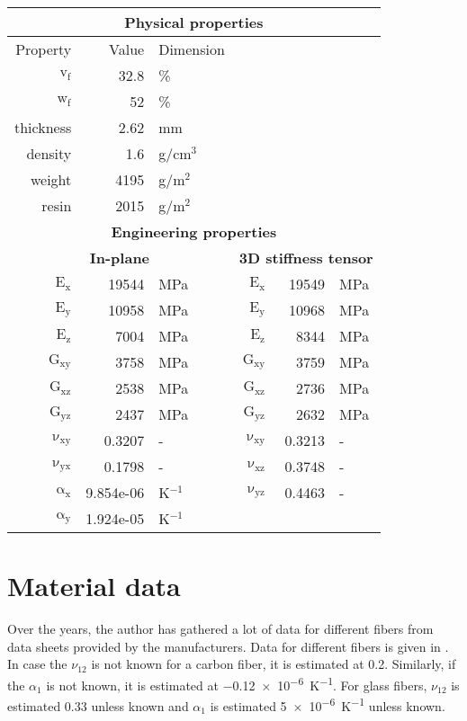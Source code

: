 \documentclass[a4paper,landscape,oneside,11pt,twocolumn]{memoir}
\begin{document}
\begin{table}[!htbp]
    \begin{tabular}[t]{rrlrrl}
      \multicolumn{6}{c}{\small\textbf{Physical properties}}\\[0.1em]
      \toprule
      Property & Value & Dimension\\
      \midrule
      $\mathrm{v_f}$ & 32.8 &\%\\
      $\mathrm{w_f}$ & 52 &\%\\
      thickness & 2.62 & mm\\
      density & 1.6 & g/cm$^3$\\
      weight & 4195 & g/m$^2$\\
      resin & 2015 & g/m$^2$\\
      \midrule
      \multicolumn{6}{c}{\small\textbf{Engineering properties}}\\[0.1em]
      \multicolumn{3}{c}{\small\textbf{In-plane}} &
      \multicolumn{3}{c}{\small\textbf{3D stiffness tensor}}\\[0.1em]
      $\mathrm{E_x}$ &    19544 & MPa & $\mathrm{E_x}$ &    19549 & MPa\\
      $\mathrm{E_y}$ &    10958 & MPa & $\mathrm{E_y}$ &    10968 & MPa\\
      $\mathrm{E_z}$ &     7004 & MPa & $\mathrm{E_z}$ &     8344 & MPa\\
      $\mathrm{G_{xy}}$ &     3758 & MPa & $\mathrm{G_{xy}}$ &     3759 & MPa\\
      $\mathrm{G_{xz}}$ &     2538 & MPa & $\mathrm{G_{xz}}$ &     2736 & MPa\\
      $\mathrm{G_{yz}}$ &     2437 & MPa &  $\mathrm{G_{yz}}$ &     2632 & MPa\\
      $\mathrm{\nu_{xy}}$ & 0.3207 &- &$\mathrm{\nu_{xy}}$ & 0.3213 &-\\
      $\mathrm{\nu_{yx}}$ & 0.1798 &- & $\mathrm{\nu_{xz}}$ & 0.3748 &-\\
      $\mathrm{\alpha_x}$ & 9.854e-06 & K$^{-1}$ &$\mathrm{\nu_{yz}}$ & 0.4463 &-\\
      $\mathrm{\alpha_y}$ & 1.924e-05 & K$^{-1}$\\
      \bottomrule
    \end{tabular}
\end{table}

\section{Material data} %

Over the years, the author has gathered a lot of data for different fibers
from data sheets provided by the manufacturers. Data for different
fibers is given in . In case the $\nu_{12}$ is not
known for a carbon fiber, it is estimated at 0.2. Similarly, if the
$\alpha_1$ is not known, it is estimated at \SI{-0.12e-6}{K^{-1}}. For glass
fibers, $\nu_{12}$ is estimated 0.33 unless known and $\alpha_1$ is estimated
\SI{5e-6}{K^{-1}} unless known.
\end{document}
